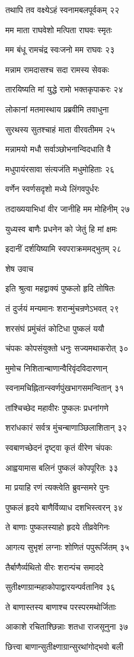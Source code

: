 तथापि तव वक्ष्येऽहं स्वनामबलपूर्वकम् २२

मम माता राघवेशो मत्पिता राघवः स्मृतः

मम बंधू रामचंद्र स्वःजनो मम राघवः २३

मन्नाम रामदासश्च सदा रामस्य सेवकः

तारयिष्यति मां युद्धे रामो भक्तकृपाकरः २४

लोकानां मतमास्थाय प्रब्रवीमि तवाधुना

सुरथस्य सुतश्चाहं माता वीरवतीमम २५

मन्नामयो मधौ सर्वाञ्छोभनान्विदधाति वै

मधुपायंरसावा संत्यजंति मधुमोहिताः २६

वर्णेन स्वर्णसदृशो मध्ये लिंगवपुर्धरः

तदाख्ययाभिधां वीर जानीहि मम मोहिनीम् २७

युध्यस्व बाणैः प्रधनेन को जेतुं हि मां क्षमः

इदानीं दर्शयिष्यामि स्वपराक्रममद्भुतम् २८

शेष उवाच

इति श्रुत्वा महद्वाक्यं पुष्कलो हृदि तोषितः

तं दुर्जयं मन्यमानः शरान्मुंचन्रणेऽभवत् २९

शरसंघं प्रमुंचंतं कोटिधा पुष्कलं ययौ

चंपकः कोपसंयुक्तो धनुः सज्यमथाकरोत् ३०

मुमोच निशितान्बाणान्वैरिवृंदविदारणान्

स्वनामचिह्नितान्स्वर्णपुंखभागसमन्वितान् ३१

तांश्चिच्छेद महावीरः पुष्कलः प्रधनांगणे

शरांधकारं सर्वत्र मुंचन्बाणाञ्छिलाशितान् ३२

स्वबाणच्छेदनं दृष्ट्वा कृतं वीरेण चंपकः

आह्वयामास बलिनं पुष्कलं कोपपूरितः ३३

मा प्रयाहि रणं त्यक्त्वेति ब्रुवन्समरे पुनः

पुष्कलं हृदये बाणैर्विव्याध दशभिस्त्वरन् ३४

ते बाणाः पुष्कलस्याहो हृदये तीव्रवेगिनः

आगत्य सुभृशं लग्नाः शोणितं पपुरूर्जितम् ३५

तैर्बाणैर्व्यथितो वीरः शरान्पंच समाददे

सुतीक्ष्णाग्रान्महाकोपाद्वारयन्पर्वतानिव ३६

ते बाणास्तस्य बाणाश्च परस्परमथोर्जिताः

आकाशे रचिताश्छिन्नाः शतधा राजसूनुना ३७

छित्त्वा बाणान्सुतीक्ष्णाग्रान्सुरथांगोद्भवो बली

